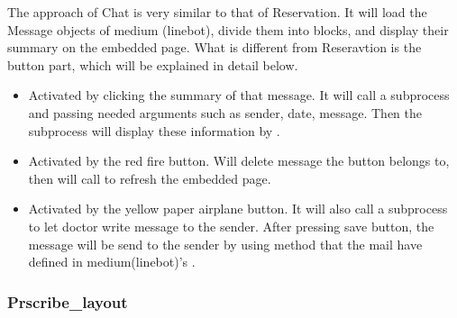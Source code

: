 \documentclass{article}
\begin{document}
The approach of Chat is very similar to that of Reservation. It will 
load the Message objects of medium (linebot), divide them into blocks, 
and display their summary on the embedded page. What is different from 
Reseravtion is the button part, which will be explained in detail below.


\begin{itemize}
  \item {} Activated by clicking the summary of that message. It will call a subprocess and passing needed arguments such as sender, date, message. Then the subprocess will display these information by .
  \item {} Activated by the red fire button. Will delete message the button belongs to, then will call  to refresh the embedded page.
  \item {} Activated by the yellow paper airplane button. It will also call a subprocess to let doctor write message to the sender. After pressing save button, the message will be send to the sender by using  method that the mail have defined in medium(linebot)'s .
\end{itemize}

\subsubsection*{Prscribe\_layout}
\end{document}
